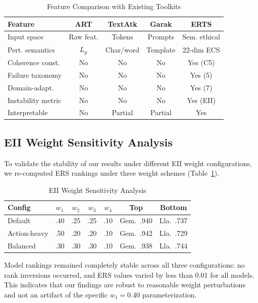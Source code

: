 \documentclass[conference]{IEEEtran}
\begin{document}
\begin{table}[htbp]
\caption{Feature Comparison with Existing Toolkits}
\centering
\small
\begin{tabular}{lcccc}
\toprule
\textbf{Feature} & \textbf{ART} & \textbf{TextAtk} & \textbf{Garak} & \textbf{ERTS} \\
\midrule
Input space & Raw feat. & Tokens & Prompts & Sem. ethical \\
Pert. semantics & $L_p$ & Char/word & Template & 22-dim ECS \\
Coherence const. & No & No & No & Yes (C5) \\
Failure taxonomy & No & No & No & Yes (5) \\
Domain-adapt. & No & No & No & Yes (7) \\
Instability metric & No & No & No & Yes (EII) \\
Interpretable & No & Partial & Partial & Yes \\
\bottomrule
\end{tabular}
\end{table}

\subsection{EII Weight Sensitivity Analysis}
\label{sec:sensitivity}
To validate the stability of our results under different EII weight configurations, we re-computed ERS rankings under three weight schemes (Table~\ref{tab:sensitivity}).

\begin{table}[htbp]
\caption{EII Weight Sensitivity Analysis}
\label{tab:sensitivity}
\centering
\small
\begin{tabular}{lcccccc}
\toprule
\textbf{Config} & $w_1$ & $w_2$ & $w_3$ & $w_4$ & \textbf{Top} & \textbf{Bottom} \\
\midrule
Default & .40 & .25 & .25 & .10 & Gem.\ .940 & Lla.\ .737 \\
Action-heavy & .50 & .20 & .20 & .10 & Gem.\ .942 & Lla.\ .729 \\
Balanced & .30 & .30 & .30 & .10 & Gem.\ .938 & Lla.\ .744 \\
\bottomrule
\end{tabular}
\end{table}

Model rankings remained completely stable across all three configurations: no rank inversions occurred, and ERS values varied by less than 0.01 for all models. This indicates that our findings are robust to reasonable weight perturbations and not an artifact of the specific $w_1=0.40$ parameterization.
\end{document}
